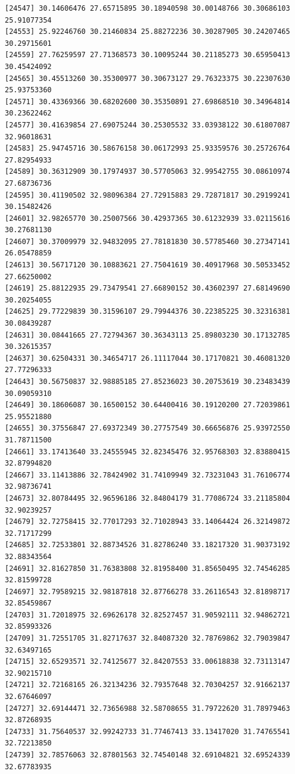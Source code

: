 \documentclass[
  letterpaper,
  DIV=11,
  numbers=noendperiod]{scrartcl}
\begin{document}
\begin{verbatim}
[24547] 30.14606476 27.65715895 30.18940598 30.00148766 30.30686103 25.91077354
[24553] 25.92246760 30.21460834 25.88272236 30.30287905 30.24207465 30.29715601
[24559] 27.76259597 27.71368573 30.10095244 30.21185273 30.65950413 30.45424092
[24565] 30.45513260 30.35300977 30.30673127 29.76323375 30.22307630 25.93753360
[24571] 30.43369366 30.68202600 30.35350891 27.69868510 30.34964814 30.23622462
[24577] 30.41639854 27.69075244 30.25305532 33.03938122 30.61807087 32.96018631
[24583] 25.94745716 30.58676158 30.06172993 25.93359576 30.25726764 27.82954933
[24589] 30.36312909 30.17974937 30.57705063 32.99542755 30.08610974 27.68736736
[24595] 30.41190502 32.98096384 27.72915883 29.72871817 30.29199241 30.15482426
[24601] 32.98265770 30.25007566 30.42937365 30.61232939 33.02115616 30.27681130
[24607] 30.37009979 32.94832095 27.78181830 30.57785460 30.27347141 26.05478859
[24613] 30.56717120 30.10883621 27.75041619 30.40917968 30.50533452 27.66250002
[24619] 25.88122935 29.73479541 27.66890152 30.43602397 27.68149690 30.20254055
[24625] 29.77229839 30.31596107 29.79944376 30.22385225 30.32316381 30.08439287
[24631] 30.08441665 27.72794367 30.36343113 25.89803230 30.17132785 30.32615357
[24637] 30.62504331 30.34654717 26.11117044 30.17170821 30.46081320 27.77296333
[24643] 30.56750837 32.98885185 27.85236023 30.20753619 30.23483439 30.09059310
[24649] 30.18606087 30.16500152 30.64400416 30.19120200 27.72039861 25.95521880
[24655] 30.37556847 27.69372349 30.27757549 30.66656876 25.93972550 31.78711500
[24661] 33.17413640 33.24555945 32.82345476 32.95768303 32.83880415 32.87994820
[24667] 33.11413886 32.78424902 31.74109949 32.73231043 31.76106774 32.98736741
[24673] 32.80784495 32.96596186 32.84804179 31.77086724 33.21185804 32.90239257
[24679] 32.72758415 32.77017293 32.71028943 33.14064424 26.32149872 32.71717299
[24685] 32.72533801 32.88734526 31.82786240 33.18217320 31.90373192 32.88343564
[24691] 32.81627850 31.76383808 32.81958400 31.85650495 32.74546285 32.81599728
[24697] 32.79589215 32.98187818 32.87766278 33.26116543 32.81898717 32.85459867
[24703] 31.72018975 32.69626178 32.82527457 31.90592111 32.94862721 32.85993326
[24709] 31.72551705 31.82717637 32.84087320 32.78769862 32.79039847 32.63497165
[24715] 32.65293571 32.74125677 32.84207553 33.00618838 32.73113147 32.90215710
[24721] 32.72168165 26.32134236 32.79357648 32.70304257 32.91662137 32.67646097
[24727] 32.69144471 32.73656988 32.58708655 31.79722620 31.78979463 32.87268935
[24733] 31.75640537 32.99242733 31.77467413 33.13417020 31.74765541 32.72213850
[24739] 32.78576063 32.87801563 32.74540148 32.69104821 32.69524339 32.67783935

\end{verbatim}
\end{document}
